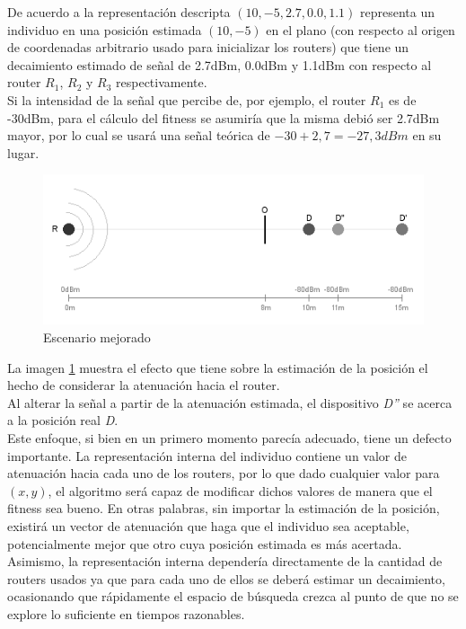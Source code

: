 \documentclass[journal]{IEEEtran}
\begin{document}
De acuerdo a la representación descripta $(10, -5, 2.7, 0.0, 1.1)$ representa un individuo en una posición estimada $(10,-5)$ en el plano (con respecto al origen de coordenadas arbitrario usado para inicializar los routers) que tiene un decaimiento estimado de señal de 2.7dBm, 0.0dBm y 1.1dBm con respecto al router $R_1$, $R_2$ y $R_3$ respectivamente.\\

Si la intensidad de la señal que percibe de, por ejemplo, el router $R_1$ es de -30dBm, para el cálculo del fitness se asumiría que la misma debió ser 2.7dBm mayor, por lo cual se usará una señal teórica de $-30 + 2,7 = -27,3dBm$ en su lugar.\\

\begin{figure}[h]
\centering
\includegraphics[width=\linewidth]{improvement.png}
\caption{Escenario mejorado}
\label{fig:improvement}
\end{figure}

La imagen \ref{fig:improvement} muestra el efecto que tiene sobre la estimación de la posición el hecho de considerar la atenuación hacia el router.\\

Al alterar la señal a partir de la atenuación estimada, el dispositivo \emph{D''} se acerca a la posición real \emph{D}.\\

Este enfoque, si bien en un primero momento parecía adecuado, tiene un defecto importante. La representación interna del individuo contiene un valor de atenuación hacia cada uno de los routers, por lo que dado cualquier valor para $(x,y)$, el algoritmo será capaz de modificar dichos valores de manera que el fitness sea bueno. En otras palabras, sin importar la estimación de la posición, existirá un vector de atenuación que haga que el individuo sea aceptable, potencialmente mejor que otro cuya posición estimada es más acertada. Asimismo, la representación interna dependería directamente de la cantidad de routers usados ya que para cada uno de ellos se deberá estimar un decaimiento, ocasionando que rápidamente el espacio de búsqueda crezca al punto de que no se explore lo suficiente en tiempos razonables.\\
\end{document}
